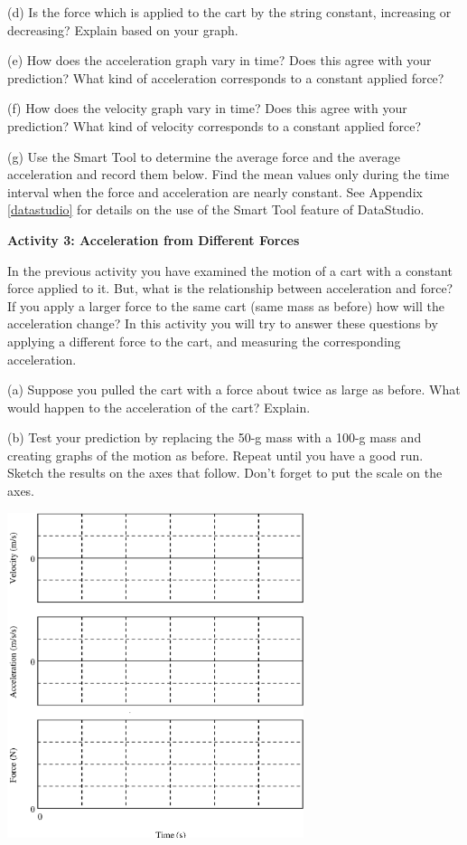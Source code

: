 (d) Is the force which is applied to the cart by the string constant, increasing
or decreasing? Explain based on your graph.
\answerspace{15mm}

\pagebreak[2]
(e) How does the acceleration graph vary in time? Does this agree with your
prediction? What kind of acceleration corresponds to a constant applied force?
\answerspace{20mm}

(f) How does the velocity graph vary in time? Does this agree with your prediction?
What kind of velocity corresponds to a constant applied force?
\answerspace{20mm}

(g) Use the Smart Tool to determine the average force and the average acceleration
and record them below. Find the mean values only during the time interval when
the force and acceleration are nearly constant. See Appendix \ref{datastudio} for details on
the use of the Smart Tool feature of DataStudio.
\answerspace{20mm}

\textbf{Activity 3: Acceleration from Different Forces }

In the previous activity you have examined the motion of a cart with a constant
force applied to it. But, what is the relationship between acceleration and
force? If you apply a larger force to the same cart (same mass as before) how
will the acceleration change? In this activity you will try to answer these
questions by applying a different force to the cart, and measuring the corresponding
acceleration. 

(a) Suppose you pulled the cart with a force about twice as large as before.
What would happen to the acceleration of the cart? Explain.
\answerspace{20mm}

\pagebreak[3]
(b) Test your prediction by replacing the 50-g mass with a 100-g mass and creating graphs of the motion as before. Repeat until you have a good run. Sketch the
results on the axes that follow. Don't forget to put the scale on the axes.

\vspace{0.3cm}
{\par\centering \includegraphics[width=0.65\textwidth]{force1/force1_fig5.eps} \par}
\vspace{0.3cm}

